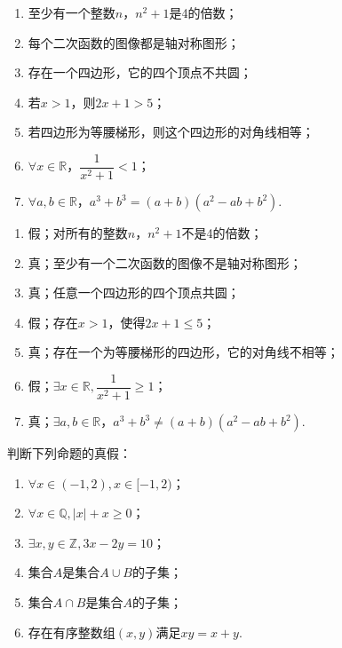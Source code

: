\documentclass[lang=cn,newtx,10pt,scheme=chinese]{elegantbook}
\begin{document}
\begin{enumerate}
  \item 至少有一个整数$n$，$n^2+1$是4的倍数；
  \item 每个二次函数的图像都是轴对称图形；
  \item 存在一个四边形，它的四个顶点不共圆；
  \item 若$x>1$，则$2x+1>5$；
  \item 若四边形为等腰梯形，则这个四边形的对角线相等；
  \item $\forall x{\in}\mathbb{R}$，$\dfrac1{x^2+1}<1$；
  \item $\forall a,b{\in}\mathbb{R}$，$a^3+b^3=(a+b)(a^2-ab+b^2)$.
\end{enumerate}

\begin{solution}
  
\end{solution}

\begin{enumerate}
  \item 假；对所有的整数$n$，$n^2+1$不是4的倍数；
  \item 真；至少有一个二次函数的图像不是轴对称图形；
  \item 真；任意一个四边形的四个顶点共圆；
  \item 假；存在$x>1$，使得$2x+1\leqslant 5$；
  \item 真；存在一个为等腰梯形的四边形，它的对角线不相等；
  \item 假；$\exists x\in\mathbb{R},\dfrac1{x^2+1}\geqslant 1$；
  \item 真；$\exists a,b{\in}\mathbb{R}$，$a^3+b^3\neq(a+b)(a^2-ab+b^2)$.
\end{enumerate}

\begin{exercise}
  判断下列命题的真假：
\end{exercise}

\begin{enumerate}
  \item $\forall x\in(-1, 2), x\in[-1, 2)$；
  \item $\forall x\in\mathbb{Q}, |x|+x\geqslant0$；
  \item $\exists x,y\in\mathbb{Z},3x-2y=10$；
  \item 集合$A$是集合$A\cup B$的子集；
  \item 集合$A\cap B$是集合$A$的子集；
  \item 存在有序整数组$(x,y)$满足$xy=x+y$.
\end{enumerate}
\end{document}
